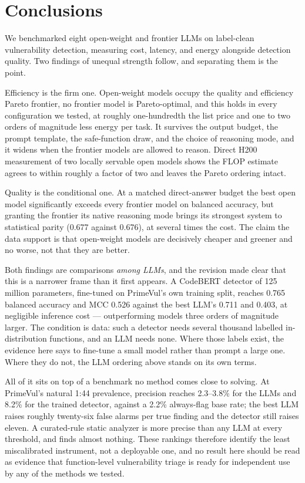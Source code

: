 \documentclass[computers,article,submit,moreauthors]{Definitions/mdpi}
\begin{document}
\section{Conclusions}
We benchmarked eight open-weight and frontier LLMs on label-clean vulnerability detection, measuring cost, latency, and energy alongside detection quality. Two findings of unequal strength follow, and separating them is the point.

Efficiency is the firm one. Open-weight models occupy the quality and efficiency Pareto frontier, no frontier model is Pareto-optimal, and this holds in every configuration we tested, at roughly one-hundredth the list price and one to two orders of magnitude less energy per task. It survives the output budget, the prompt template, the safe-function draw, and the choice of reasoning mode, and it widens when the frontier models are allowed to reason. Direct H200 measurement of two locally servable open models shows the FLOP estimate agrees to within roughly a factor of two and leaves the Pareto ordering intact.

Quality is the conditional one. At a matched direct-answer budget the best open model significantly exceeds every frontier model on balanced accuracy, but granting the frontier its native reasoning mode brings its strongest system to statistical parity (0.677 against 0.676), at several times the cost. The claim the data support is that open-weight models are decisively cheaper and greener and no worse, not that they are better.

Both findings are comparisons \emph{among LLMs}, and the revision made clear that this is a narrower frame than it first appears. A CodeBERT detector of 125 million parameters, fine-tuned on PrimeVul's own training split, reaches 0.765 balanced accuracy and MCC 0.526 against the best LLM's 0.711 and 0.403, at negligible inference cost --- outperforming models three orders of magnitude larger. The condition is data: such a detector needs several thousand labelled in-distribution functions, and an LLM needs none. Where those labels exist, the evidence here says to fine-tune a small model rather than prompt a large one. Where they do not, the LLM ordering above stands on its own terms.

All of it sits on top of a benchmark no method comes close to solving. At PrimeVul's natural 1:44 prevalence, precision reaches 2.3--3.8\% for the LLMs and 8.2\% for the trained detector, against a 2.2\% always-flag base rate; the best LLM raises roughly twenty-six false alarms per true finding and the detector still raises eleven. A curated-rule static analyzer is more precise than any LLM at every threshold, and finds almost nothing. These rankings therefore identify the least miscalibrated instrument, not a deployable one, and no result here should be read as evidence that function-level vulnerability triage is ready for independent use by any of the methods we tested.
\end{document}
